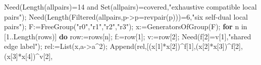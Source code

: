 \documentclass[
  11pt,
  a4paper,
]{article}
\newenvironment{Shaded}{}{}
\newcommand{\BuiltInTok}[1]{\textcolor[rgb]{0.00,0.50,0.00}{#1}}
\newcommand{\ConstantTok}[1]{\textcolor[rgb]{0.53,0.00,0.00}{#1}}
\newcommand{\ControlFlowTok}[1]{\textcolor[rgb]{0.00,0.44,0.13}{\textbf{#1}}}
\newcommand{\ExtensionTok}[1]{#1}
\newcommand{\FloatTok}[1]{\textcolor[rgb]{0.25,0.63,0.44}{#1}}
\newcommand{\NormalTok}[1]{#1}
\newcommand{\OperatorTok}[1]{\textcolor[rgb]{0.40,0.40,0.40}{#1}}
\newcommand{\StringTok}[1]{\textcolor[rgb]{0.25,0.44,0.63}{#1}}
\newcommand{\VariableTok}[1]{\textcolor[rgb]{0.10,0.09,0.49}{#1}}
\begin{document}
\begin{Shaded}
\begin{Highlighting}[]
\VariableTok{Need}\NormalTok{(}\BuiltInTok{Length}\NormalTok{(}\VariableTok{allpairs}\NormalTok{)}\OperatorTok{=}\FloatTok{14} \ConstantTok{and} \BuiltInTok{Set}\NormalTok{(}\VariableTok{allpairs}\NormalTok{)}\OperatorTok{=}\VariableTok{covered}\OperatorTok{,}\StringTok{"exhaustive compatible local pairs"}\NormalTok{)}\OperatorTok{;}
\VariableTok{Need}\NormalTok{(}\BuiltInTok{Length}\NormalTok{(}\BuiltInTok{Filtered}\NormalTok{(}\VariableTok{allpairs}\OperatorTok{,}\VariableTok{p}\OperatorTok{{-}\textgreater{}}\VariableTok{p}\OperatorTok{=}\VariableTok{revpair}\NormalTok{(}\VariableTok{p}\NormalTok{)))}\OperatorTok{=}\FloatTok{6}\OperatorTok{,}\StringTok{"six self{-}dual local pairs"}\NormalTok{)}\OperatorTok{;}
\VariableTok{F}\OperatorTok{:=}\BuiltInTok{FreeGroup}\NormalTok{(}\StringTok{"r0"}\OperatorTok{,}\StringTok{"r1"}\OperatorTok{,}\StringTok{"r2"}\OperatorTok{,}\StringTok{"r3"}\NormalTok{)}\OperatorTok{;} \VariableTok{x}\OperatorTok{:=}\BuiltInTok{GeneratorsOfGroup}\NormalTok{(}\VariableTok{F}\NormalTok{)}\OperatorTok{;}
\ControlFlowTok{for} \VariableTok{n} \ExtensionTok{in}\NormalTok{ [}\FloatTok{1}\OperatorTok{..}\BuiltInTok{Length}\NormalTok{(}\VariableTok{rows}\NormalTok{)] }\ControlFlowTok{do}
  \VariableTok{row}\OperatorTok{:=}\VariableTok{rows}\NormalTok{[}\VariableTok{n}\NormalTok{]}\OperatorTok{;} \VariableTok{f}\OperatorTok{:=}\VariableTok{row}\NormalTok{[}\FloatTok{1}\NormalTok{]}\OperatorTok{;} \VariableTok{v}\OperatorTok{:=}\VariableTok{row}\NormalTok{[}\FloatTok{2}\NormalTok{]}\OperatorTok{;} \VariableTok{Need}\NormalTok{(}\VariableTok{f}\NormalTok{[}\FloatTok{2}\NormalTok{]}\OperatorTok{=}\VariableTok{v}\NormalTok{[}\FloatTok{1}\NormalTok{]}\OperatorTok{,}\StringTok{"shared edge label"}\NormalTok{)}\OperatorTok{;}
  \VariableTok{rel}\OperatorTok{:=}\BuiltInTok{List}\NormalTok{(}\VariableTok{x}\OperatorTok{,}\VariableTok{a}\OperatorTok{{-}\textgreater{}}\VariableTok{a}\OperatorTok{\^{}}\FloatTok{2}\NormalTok{)}\OperatorTok{;}
  \BuiltInTok{Append}\NormalTok{(}\VariableTok{rel}\OperatorTok{,}\NormalTok{[(}\VariableTok{x}\NormalTok{[}\FloatTok{1}\NormalTok{]}\OperatorTok{*}\VariableTok{x}\NormalTok{[}\FloatTok{2}\NormalTok{])}\OperatorTok{\^{}}\VariableTok{f}\NormalTok{[}\FloatTok{1}\NormalTok{]}\OperatorTok{,}\NormalTok{(}\VariableTok{x}\NormalTok{[}\FloatTok{2}\NormalTok{]}\OperatorTok{*}\VariableTok{x}\NormalTok{[}\FloatTok{3}\NormalTok{])}\OperatorTok{\^{}}\VariableTok{f}\NormalTok{[}\FloatTok{2}\NormalTok{]}\OperatorTok{,}\NormalTok{(}\VariableTok{x}\NormalTok{[}\FloatTok{3}\NormalTok{]}\OperatorTok{*}\VariableTok{x}\NormalTok{[}\FloatTok{4}\NormalTok{])}\OperatorTok{\^{}}\VariableTok{v}\NormalTok{[}\FloatTok{2}\NormalTok{]}\OperatorTok{,}

\end{Highlighting}
\end{Shaded}
\end{document}
